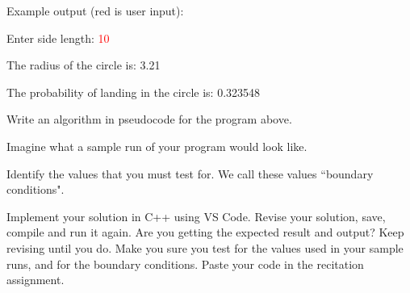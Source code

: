 Example output (red is user input):

\begin{sample}
Enter side length: \textcolor{red}{10}

The radius of the circle is: 3.21

The probability of landing in the circle is: 0.323548
\end{sample}

\begin{multipart}
Write an algorithm in pseudocode for the program above.
\end{multipart}

\vspace{6cm}

\begin{multipart}
Imagine what a sample run of your program would look like.
\end{multipart}

\vspace{6cm}

\begin{multipart}
 Identify the values that you must test for. We call these values ``boundary conditions".
\end{multipart}

\vspace{6cm}

\begin{multipart}
Implement your solution in C++ using VS Code. Revise your solution, save, compile and run it again. Are you getting the expected result and output? Keep revising until you do. Make you sure you test for the values used in your sample runs, and for the boundary conditions. Paste your code in the recitation assignment.
\end{multipart}

